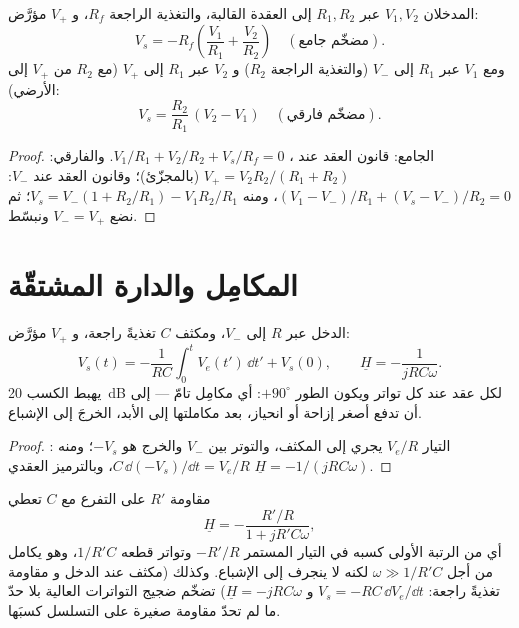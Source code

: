 \begin{proposition}\label{prop:b1:operational-amplifier:sumdiff}
المدخلان $V_1, V_2$ عبر $R_1, R_2$ إلى العقدة القالبة، والتغذية الراجعة
$R_f$، و $V_+$ مؤرَّض:
\[
V_s = -R_f\left(\frac{V_1}{R_1} + \frac{V_2}{R_2}\right)
\quad (\text{مضخّم جامع}).
\]
ومع $V_1$ عبر $R_1$ إلى $V_-$ (والتغذية الراجعة $R_2$) و $V_2$ عبر
$R_1$ إلى $V_+$ (مع $R_2$ من $V_+$ إلى الأرضي):
\[
V_s = \frac{R_2}{R_1}\,(V_2 - V_1)
\quad (\text{مضخّم فارقي}).
\]
\end{proposition}

\begin{proof}
الجامع: قانون العقد عند ، $V_1/R_1 + V_2/R_2 + V_s/R_f =
0$. والفارقي: $V_+ = V_2R_2/(R_1 + R_2)$ (بالمجزّئ)؛ وقانون العقد عند $V_-$:
$(V_1 - V_-)/R_1 + (V_s - V_-)/R_2 = 0$، ومنه $V_s = V_-(1 + R_2/R_1) -
V_1R_2/R_1$؛ ثم نضع $V_- = V_+$ ونبسّط.
\end{proof}

\section{المكامِل والدارة المشتقّة}

\begin{proposition}[المكامِل]\label{prop:b1:operational-amplifier:integrator}
الدخل عبر $R$ إلى $V_-$، ومكثف $C$ تغذيةً راجعة، و $V_+$
مؤرَّض:
\[
V_s(t) = -\frac{1}{RC}\int_0^t V_e(t')\,\dd t' + V_s(0),
\qquad
\underline H = -\frac{1}{jRC\omega} .
\]
يهبط الكسب \qty{20}{dB} لكل عقد عند كل تواتر ويكون الطور
$+90^\circ$: أي مكامِل تامّ --- إلى أن تدفع أصغر إزاحة أو
انحياز، بعد مكاملتها إلى الأبد، الخرجَ إلى الإشباع.
\end{proposition}

\begin{proof}
: التيار $V_e/R$ يجري إلى المكثف، والتوتر بين
$V_-$ والخرج هو $-V_s$؛ ومنه $C\,\dd(-V_s)/\dd t
= V_e/R$، وبالترميز العقدي $\underline H = -1/(jRC\omega)$.
\end{proof}

\begin{remark}\label{rem:b1:operational-amplifier:pseudo}
مقاومة $R'$ على التفرع مع $C$ تعطي
\[
\underline H = -\frac{R'/R}{1 + jR'C\omega},
\]
أي  من الرتبة الأولى كسبه في التيار المستمر $-R'/R$ وتواتر قطعه $1/R'C$، وهو
يكامل من أجل $\omega \gg 1/R'C$ لكنه لا ينجرف إلى الإشباع. وكذلك  (مكثف عند الدخل و
مقاومة تغذيةً راجعة: $V_s = -RC\,\dd V_e/\dd t$ و $\underline H =
-jRC\omega$) تضخّم ضجيج التواترات العالية بلا حدّ ما لم تحدّ
مقاومة صغيرة على التسلسل كسبَها.
\end{remark}


